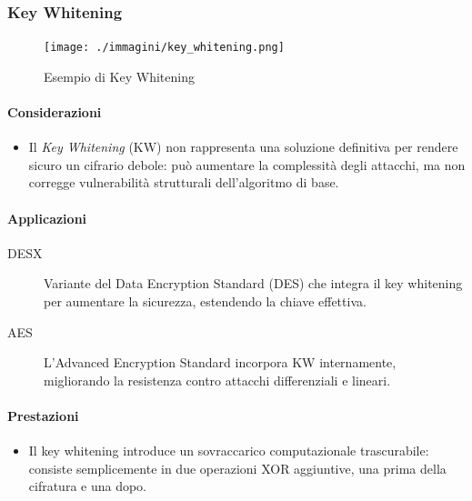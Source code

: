 \documentclass{report}
\begin{document}
\subsubsection{Key Whitening}

\begin{figure}[h]
    \centering
    \texttt{[image: ./immagini/key\_whitening.png]} %
    \caption{Esempio di Key Whitening}
    \label{fig:key-whitening}
\end{figure}

\paragraph{Considerazioni}
\begin{itemize}
    \item Il \textit{Key Whitening} (KW) non rappresenta una soluzione definitiva per rendere sicuro un cifrario debole: può aumentare la complessità degli attacchi, ma non corregge vulnerabilità strutturali dell’algoritmo di base.
\end{itemize}

\paragraph{Applicazioni}
\begin{description}
    \item[DESX] Variante del Data Encryption Standard (DES) che integra il key whitening per aumentare la sicurezza, estendendo la chiave effettiva.
    \item[AES] L’Advanced Encryption Standard incorpora KW internamente, migliorando la resistenza contro attacchi differenziali e lineari.
\end{description}

\paragraph{Prestazioni}
\begin{itemize}
    \item Il key whitening introduce un sovraccarico computazionale trascurabile: consiste semplicemente in due operazioni XOR aggiuntive, una prima della cifratura e una dopo.
\end{itemize}
\end{document}
